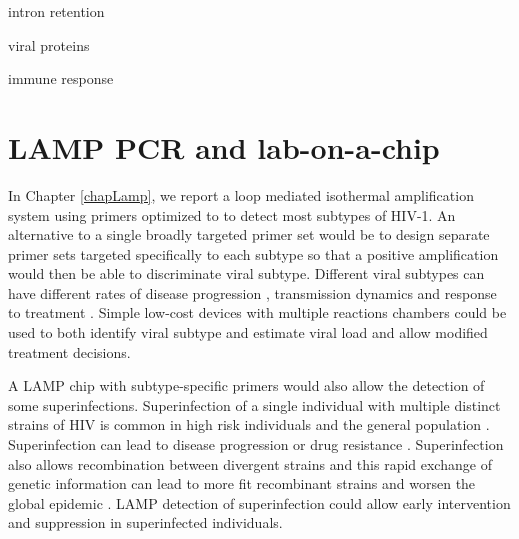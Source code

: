 \documentclass[../sherrill-Mix_thesis.tex]{subfiles}
\begin{document}
intron retention

viral proteins

immune response

\section{LAMP PCR and lab-on-a-chip}
		In Chapter \ref{chapLamp}, we report a loop mediated isothermal amplification system using primers optimized to to detect most subtypes of HIV-1. An alternative to a single broadly targeted primer set would be to design separate primer sets targeted specifically to each subtype so that a positive amplification would then be able to discriminate viral subtype. Different viral subtypes can have different rates of disease progression \citep{Kanki1999,Kaleebu2002,Baeten2007,Kiwanuka2008}, transmission dynamics \citep{Renjifo2004,John-Stewart2005,Huang2007b} and response to treatment \citep{Snoeck2006,Easterbrook2010,Scherrer2011}. Simple low-cost devices with multiple reactions chambers could be used to both identify viral subtype and estimate viral load \citep{Liu2014a,Mauk2015} and allow modified treatment decisions.
		
		A LAMP chip with subtype-specific primers would also allow the detection of some superinfections. Superinfection of a single individual with multiple distinct strains of HIV is common in high risk individuals \citep{Piantadosi2007,Powell2009,Ronen2013,Wagner2013,Redd2014} and the general population \citep{Redd2012a}. Superinfection can lead to disease progression \citep{Jost2002,Fang2004,Blick2007,Gottlieb2007,Streeck2008,Clerc2010} or drug resistance \citep{Smith2005}. Superinfection also allows recombination between divergent strains \citep{Fang2004,Pernas2006,Blick2007,Piantadosi2007,Streeck2008} and this rapid exchange of genetic information can lead to more fit recombinant strains and worsen the global epidemic \citep{Robertson1995,Gao1999,Hahn2000,Malim2001,Blick2007}. LAMP detection of superinfection could allow early intervention and suppression in superinfected individuals.
\end{document}
